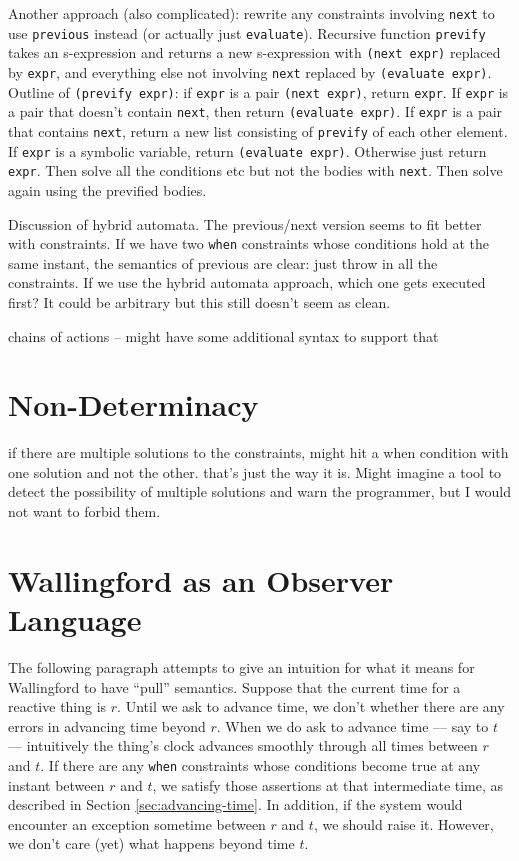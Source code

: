 \documentclass{article}
\begin{document}
Another approach (also complicated): rewrite any constraints involving
\verb|next| to use \verb|previous| instead (or actually just
\verb|evaluate|).  Recursive function \verb|prevify| takes an s-expression
and returns a new s-expression with \verb|(next expr)| replaced by
\verb|expr|, and everything else not involving \verb|next| replaced by
\verb|(evaluate expr)|.  Outline of \verb|(prevify expr)|: if \verb|expr|
is a pair \verb|(next expr)|, return \verb|expr|.  If \verb|expr| is a pair
that doesn't contain \verb|next|, then return \verb|(evaluate expr)|.  If
\verb|expr| is a pair that contains \verb|next|, return a new list
consisting of \verb|prevify| of each other element.  If \verb|expr| is a
symbolic variable, return \verb|(evaluate expr)|.  Otherwise just return
\verb|expr|.  Then solve all the conditions etc but not the bodies with
\verb|next|.  Then solve again using the prevified bodies.

Discussion of hybrid automata.  The previous/next version seems to
fit better with constraints.  If we have two \verb|when| constraints
whose conditions hold at the same instant, the semantics of previous
are clear: just throw in all the constraints.  If we use the hybrid
automata approach, which one gets executed first?  It could be
arbitrary but this still doesn't seem as clean.

chains of actions -- might have some additional syntax to support that

\section{Non-Determinacy}

if there are multiple solutions to the constraints, might hit a when
condition with one solution and not the other.  that's just the way it is.
Might imagine a tool to detect the possibility of multiple solutions and
warn the programmer, but I would not want to forbid them.

\section{Wallingford as an Observer Language}

The following paragraph attempts to give an intuition for what it means for
Wallingford to have ``pull'' semantics.  Suppose that the current time for
a reactive thing is $r$\@.  Until we ask to advance time, we don't whether
there are any errors in advancing time beyond $r$.  When we do ask to
advance time --- say to $t$ --- intuitively the thing's clock advances
smoothly through all times between $r$ and $t$.  If there are any
\verb|when| constraints whose conditions become true at any instant between
$r$ and $t$, we satisfy those assertions at that intermediate time, as
described in Section \ref{sec:advancing-time}.  In addition, if the system
would encounter an exception sometime between $r$ and $t$, we should raise
it.  However, we don't care (yet) what happens beyond time $t$\@.
\end{document}
